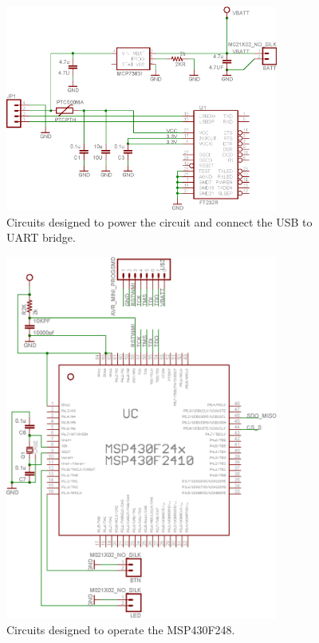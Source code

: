 \begin{figure}
\begin{center}
\includegraphics[width=0.8\textwidth]{images/USBPOWER.eps}
\caption{Circuits designed to power the circuit and connect the USB to UART bridge.}
\label{Fig:USBPOWER}
\end{center}
\end{figure}

\begin{figure}
\begin{center}
\includegraphics[width=0.8\textwidth]{images/MSP430CKT.eps}
\caption{Circuits designed to operate the MSP430F248.}
\label{Fig:MSP430CKT}
\end{center}
\end{figure}

